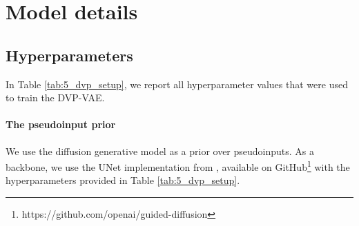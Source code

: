 \newpage
\section{Model details}

\subsection{Hyperparameters}\label{appendix:hyperparams}
In Table \ref{tab:5_dvp_setup}, we report all hyperparameter values that were used to train the DVP-VAE.

\paragraph{The pseudoinput prior}
We use the diffusion generative model as a prior over pseudoinputs. As a backbone, we use the UNet implementation from \citep{dhariwal2021diffusion}, available on GitHub\footnote{https://github.com/openai/guided-diffusion} with the hyperparameters provided in Table \ref{tab:5_dvp_setup}.

